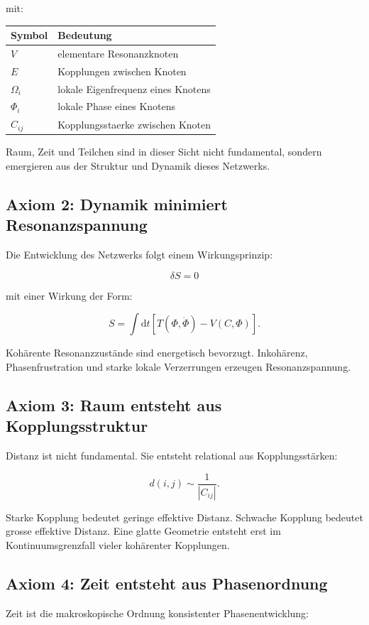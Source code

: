 \documentclass[11pt,a4paper]{article}
\newcommand{\dd}{\mathrm{d}}
\begin{document}
mit:
\begin{longtable}{>{\raggedright\arraybackslash}p{3cm}p{10cm}}
\toprule
Symbol & Bedeutung \\
\midrule
$V$ & elementare Resonanzknoten \\
$E$ & Kopplungen zwischen Knoten \\
$\Omega_i$ & lokale Eigenfrequenz eines Knotens \\
$\Phi_i$ & lokale Phase eines Knotens \\
$C_{ij}$ & Kopplungsstaerke zwischen Knoten \\
\bottomrule
\end{longtable}

Raum, Zeit und Teilchen sind in dieser Sicht nicht fundamental, sondern emergieren aus der Struktur und Dynamik
dieses Netzwerks.

\subsection{Axiom 2: Dynamik minimiert Resonanzspannung}

Die Entwicklung des Netzwerks folgt einem Wirkungsprinzip:

\[
\delta S = 0
\]

mit einer Wirkung der Form:

\[
S=\int \dd t \left[T(\Phi,\dot{\Phi}) - V(C,\Phi)\right].
\]

Kohärente Resonanzzustände sind energetisch bevorzugt. Inkohärenz, Phasenfrustration und starke lokale
Verzerrungen erzeugen Resonanzspannung.

\subsection{Axiom 3: Raum entsteht aus Kopplungsstruktur}

Distanz ist nicht fundamental. Sie entsteht relational aus Kopplungsstärken:

\[
d(i,j)\sim \frac{1}{|C_{ij}|}.
\]

Starke Kopplung bedeutet geringe effektive Distanz. Schwache Kopplung bedeutet grosse effektive Distanz.
Eine glatte Geometrie entsteht erst im Kontinuumsgrenzfall vieler kohärenter Kopplungen.

\subsection{Axiom 4: Zeit entsteht aus Phasenordnung}

Zeit ist die makroskopische Ordnung konsistenter Phasenentwicklung:
\end{document}
